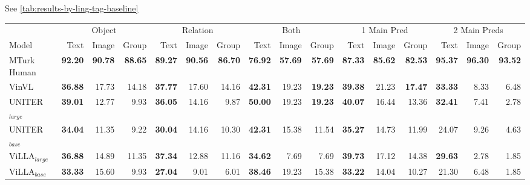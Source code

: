 See \cref{tab:results-by-ling-tag-baseline}

\begin{table}[ht]
    \centering
    \begin{adjustbox}{max width=\textwidth}
  \begin{tabular}{l|rrr|rrr|rrr|rrr|rrr}
    \toprule
     &
      \multicolumn{3}{c|}{Object} &
      \multicolumn{3}{c|}{Relation} &
      \multicolumn{3}{c|}{Both} &
      \multicolumn{3}{c|}{1 Main Pred} &
      \multicolumn{3}{c}{2 Main Preds}\\
    Model & Text & Image & Group & Text & Image & Group & Text & Image & Group & Text & Image & Group & Text & Image & Group \\\midrule
 MTurk Human                  & \textbf{92.20} & \textbf{90.78} & \textbf{88.65} & \textbf{89.27} & \textbf{90.56} & \textbf{86.70} & \textbf{76.92} & \textbf{57.69} & \textbf{57.69} & \textbf{87.33} & \textbf{85.62} & \textbf{82.53} & \textbf{95.37} & \textbf{96.30} & \textbf{93.52} \\
 VinVL                        & \textbf{36.88} & 17.73          & 14.18          & \textbf{37.77} & 17.60          & 14.16          & \textbf{42.31} & 19.23          & \textbf{19.23} & \textbf{39.38} & 21.23          & \textbf{17.47} & \textbf{33.33} & 8.33           & 6.48           \\
 UNITER$_{large}$             & \textbf{39.01} & 12.77          & 9.93           & \textbf{36.05} & 14.16          & 9.87           & \textbf{50.00} & 19.23          & \textbf{19.23} & \textbf{40.07} & 16.44          & 13.36          & \textbf{32.41} & 7.41           & 2.78           \\
 UNITER$_{base}$              & \textbf{34.04} & 11.35          & 9.22           & \textbf{30.04} & 14.16          & 10.30          & \textbf{42.31} & 15.38          & 11.54          & \textbf{35.27} & 14.73          & 11.99          & 24.07          & 9.26           & 4.63           \\
 ViLLA$_{large}$              & \textbf{36.88} & 14.89          & 11.35          & \textbf{37.34} & 12.88          & 11.16          & \textbf{34.62} & 7.69           & 7.69           & \textbf{39.73} & 17.12          & 14.38          & \textbf{29.63} & 2.78           & 1.85           \\
 ViLLA$_{base}$               & \textbf{33.33} & 15.60          & 9.93           & \textbf{27.04} & 9.01           & 6.01           & \textbf{38.46} & 19.23          & 15.38          & \textbf{33.22} & 14.04          & 10.27          & 21.30          & 6.48           & 1.85           \\

\end{tabular}
\end{adjustbox}
\end{table}
